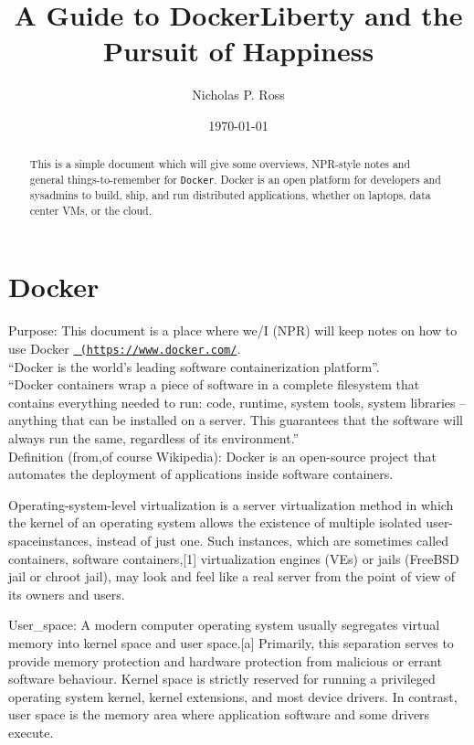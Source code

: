 \documentclass[11pt]{article}
\begin{document}
\title{A Guide to DockerLiberty and the Pursuit of Happiness}
\author{Nicholas P. Ross}
\date{\today}
\maketitle


\begin{abstract}
This is a simple document which will give some overviews, NPR-style
notes and general things-to-remember for {\tt Docker}. Docker is an
open platform for developers and sysadmins to build, ship, and run
distributed applications, whether on laptops, data center VMs, or the
cloud.
\end{abstract}


\section{Docker}

Purpose: This document is a place where we/I (NPR) will keep notes on
how to use Docker \href{https://www.docker.com/}{\tt
(https://www.docker.com/}.\\

\noindent
``Docker is the world's leading software containerization platform''.\\

\noindent
``Docker containers wrap a piece of software in a complete filesystem that contains everything needed to run: code, runtime, system tools, system libraries – anything that can be installed on a server. This guarantees that the software will always run the same, regardless of its environment.''\\


Definition (from,of course Wikipedia): 
Docker is an open-source project that automates the deployment of applications inside software containers.  

Operating-system-level virtualization is a server virtualization method in which the kernel of an operating system allows the existence of multiple isolated user-spaceinstances, instead of just one. Such instances, which are sometimes called containers, software containers,[1] virtualization engines (VEs) or jails (FreeBSD jail or chroot jail), may look and feel like a real server from the point of view of its owners and users.

User_space: A modern computer operating system usually segregates virtual memory into kernel space and user space.[a] Primarily, this separation serves to provide memory protection and hardware protection from malicious or errant software behaviour.
Kernel space is strictly reserved for running a privileged operating system kernel, kernel extensions, and most device drivers. In contrast, user space is the memory area where application software and some drivers execute.
\end{document}
